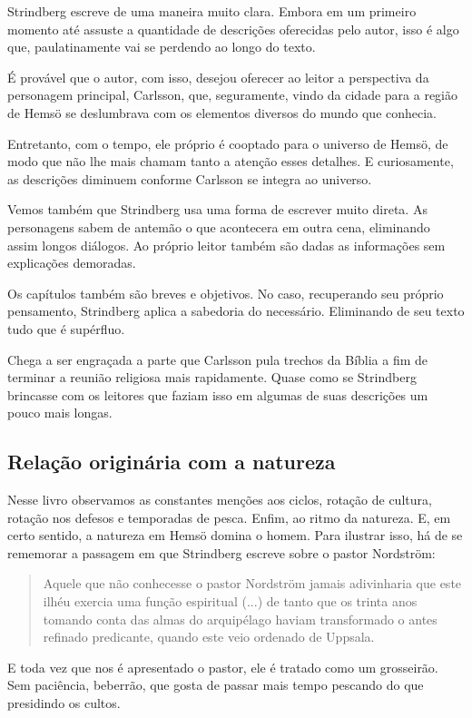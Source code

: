 \documentclass[12pt]{extarticle}
\begin{document}
Strindberg escreve de uma maneira muito clara. Embora em um primeiro
momento até assuste a quantidade de descrições oferecidas pelo autor,
isso é algo que, paulatinamente vai se perdendo ao longo do texto.

É provável que o autor, com isso, desejou oferecer ao leitor a
perspectiva da personagem principal, Carlsson, que, seguramente, vindo
da cidade para a região de Hemsö se deslumbrava com os elementos
diversos do mundo que conhecia.

Entretanto, com o tempo, ele próprio é cooptado para o universo de
Hemsö, de modo que não lhe mais chamam tanto a atenção esses detalhes. E
curiosamente, as descrições diminuem conforme Carlsson se integra ao
universo.

Vemos também que Strindberg usa uma forma de escrever muito direta. As
personagens sabem de antemão o que acontecera em outra cena, eliminando
assim longos diálogos. Ao próprio leitor também são dadas as informações
sem explicações demoradas.

Os capítulos também são breves e objetivos. No caso, recuperando seu
próprio pensamento, Strindberg aplica a sabedoria do necessário.
Eliminando de seu texto tudo que é supérfluo.

Chega a ser engraçada a parte que Carlsson pula trechos da Bíblia a fim
de terminar a reunião religiosa mais rapidamente. Quase como se
Strindberg brincasse com os leitores que faziam isso em algumas de suas
descrições um pouco mais longas.

\subsection{Relação originária com a natureza}

Nesse livro observamos as constantes menções aos ciclos, rotação de
cultura, rotação nos defesos e temporadas de pesca. Enfim, ao ritmo da
natureza. E, em certo sentido, a natureza em Hemsö domina o homem. Para
ilustrar isso, há de se rememorar a passagem em que Strindberg escreve
sobre o pastor Nordström:

\begin{quote}
Aquele que não conhecesse o pastor Nordström jamais adivinharia que este
ilhéu exercia uma função espiritual (...) de tanto que os trinta anos
tomando conta das almas do arquipélago haviam transformado o antes
refinado predicante, quando este veio ordenado de Uppsala.
\end{quote}

E toda vez que nos é apresentado o pastor, ele é tratado como um
grosseirão. Sem paciência, beberrão, que gosta de passar mais tempo
pescando do que presidindo os cultos.
\end{document}
